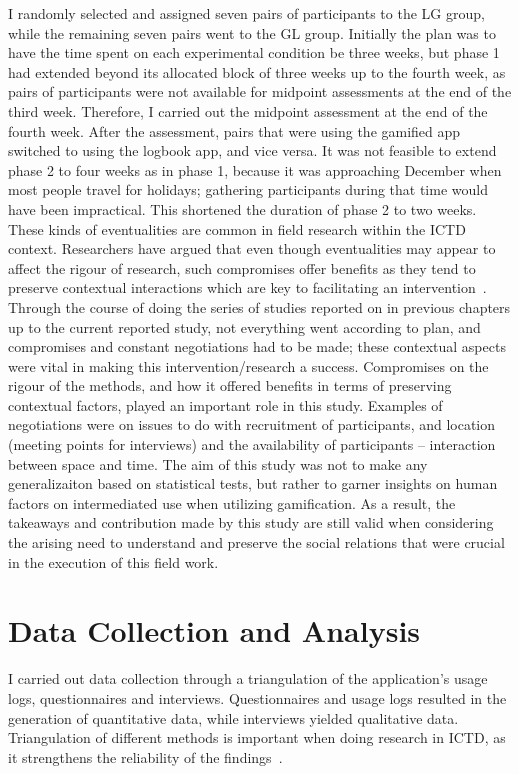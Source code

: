 I randomly selected and assigned seven pairs of participants to the LG group, while the remaining seven pairs went to the GL group. Initially the plan was to have the time spent on each experimental condition be three weeks, but phase 1 had extended beyond its allocated block of three weeks up to the fourth week, as pairs of participants were not available for midpoint assessments at the end of the third week. Therefore, I carried out the midpoint assessment at the end of the fourth week. After the assessment, pairs that were using the gamified app switched to using the logbook app, and vice versa. It was not feasible to extend phase 2 to four weeks as in phase 1, because it was approaching December when most people travel for holidays; gathering participants during that time would have been impractical. This shortened the duration of phase 2 to two weeks. These kinds of eventualities are common in field research within the ICTD context. Researchers have argued that even though eventualities may appear to affect the rigour of research, such compromises offer benefits as they tend to preserve contextual interactions which are key to facilitating an intervention~\citep{anokwa2009stories,ramachandran2010research}. Through the course of doing the series of studies reported on in previous chapters up to the current reported study, not everything went according to plan, and compromises and constant negotiations had to be made; these contextual aspects were vital in making this intervention/research a success. Compromises on the rigour of the methods, and how it offered benefits in terms of preserving contextual factors, played an important role in this study. Examples of negotiations were on issues to do with recruitment of participants, and location (meeting points for interviews) and the availability of participants -- interaction between space and time. The aim of this study was not to make any generalizaiton based on statistical tests, but rather to garner insights on human factors on intermediated use when utilizing gamification.  As a result, the takeaways and contribution made by this study are still valid when considering the arising need to understand and preserve the social relations that were crucial in the execution of this field work.
\section{Data Collection and Analysis}\label{datacollect}
I carried out data collection through a triangulation of the application's usage logs, questionnaires and interviews. Questionnaires and usage logs resulted in the generation of quantitative data, while interviews yielded qualitative data. Triangulation of different methods is important when doing research in ICTD, as it strengthens the reliability of the findings~\citep{burrell2009constitutes}.

